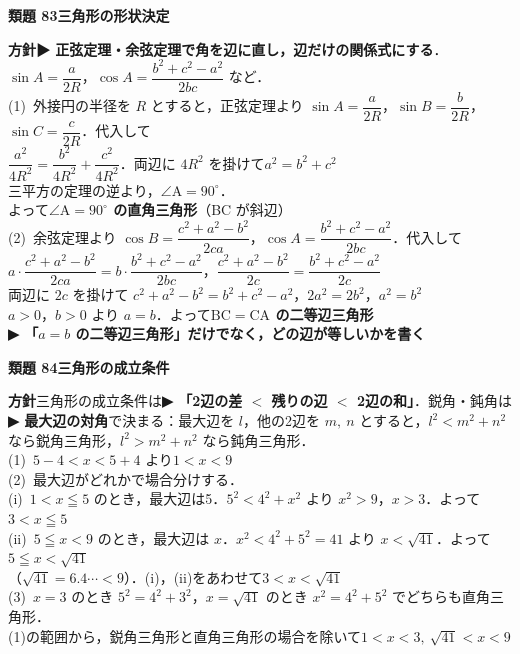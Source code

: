 \documentclass[a4paper,11pt]{ltjsarticle}
\newcommand{\ans}[2]{\Needspace{5\baselineskip}\vspace{6pt}%
  {\sffamily\bfseries 類題 #1\quad #2}\par}
\newcommand{\point}[1]{\textsf{\bfseries ▶ #1}}
\begin{document}
\ans{83}{三角形の形状決定}
\begin{kai}
\textbf{方針}\quad \point{正弦定理・余弦定理で角を辺に直し，辺だけの関係式にする}．$\sin A=\dfrac a{2R}$，$\cos A=\dfrac{b^2+c^2-a^2}{2bc}$ など．\\[2pt]
(1)\ 外接円の半径を $R$ とすると，正弦定理より $\sin A=\dfrac a{2R}$，$\sin B=\dfrac b{2R}$，$\sin C=\dfrac c{2R}$．代入して\\
\hspace*{1.5em}$\dfrac{a^2}{4R^2}=\dfrac{b^2}{4R^2}+\dfrac{c^2}{4R^2}$．両辺に $4R^2$ を掛けて\quad $a^2=b^2+c^2$\\
\hspace*{1.5em}三平方の定理の逆より，$\angle\mathrm A=90^\circ$．\\
\hspace*{1.5em}よって\quad \textbf{$\angle\mathrm A=90^\circ$ の直角三角形}（BC が斜辺）\\[2pt]
(2)\ 余弦定理より $\cos B=\dfrac{c^2+a^2-b^2}{2ca}$，$\cos A=\dfrac{b^2+c^2-a^2}{2bc}$．代入して\\
\hspace*{1.5em}$a\cdot\dfrac{c^2+a^2-b^2}{2ca}=b\cdot\dfrac{b^2+c^2-a^2}{2bc}$，\quad $\dfrac{c^2+a^2-b^2}{2c}=\dfrac{b^2+c^2-a^2}{2c}$\\[2pt]
\hspace*{1.5em}両辺に $2c$ を掛けて $c^2+a^2-b^2=b^2+c^2-a^2$，\quad $2a^2=2b^2$，\quad $a^2=b^2$\\
\hspace*{1.5em}$a>0$，$b>0$ より $a=b$．よって\quad \textbf{$\mathrm{BC}=\mathrm{CA}$ の二等辺三角形}\\
\hspace*{1.5em}\point{「$a=b$ の二等辺三角形」だけでなく，どの辺が等しいかを書く}
\end{kai}

\ans{84}{三角形の成立条件}
\begin{kai}
\textbf{方針}\quad 三角形の成立条件は\point{「2辺の差 $<$ 残りの辺 $<$ 2辺の和」}．鋭角・鈍角は\point{最大辺の対角}で決まる：最大辺を $l$，他の2辺を $m,\ n$ とすると，$l^2<m^2+n^2$ なら鋭角三角形，$l^2>m^2+n^2$ なら鈍角三角形．\\[2pt]
(1)\ $5-4<x<5+4$ より\quad $1<x<9$\\[2pt]
(2)\ 最大辺がどれかで場合分けする．\\
\hspace*{1.5em}(i)\ $1<x\leqq5$ のとき，最大辺は5．$5^2<4^2+x^2$ より $x^2>9$，$x>3$．よって $3<x\leqq5$\\
\hspace*{1.5em}(ii)\ $5\leqq x<9$ のとき，最大辺は $x$．$x^2<4^2+5^2=41$ より $x<\sqrt{41}$．よって $5\leqq x<\sqrt{41}$\\
\hspace*{1.5em}（$\sqrt{41}=6.4\cdots<9$）．(i)，(ii)をあわせて\quad $3<x<\sqrt{41}$\\[2pt]
(3)\ $x=3$ のとき $5^2=4^2+3^2$，$x=\sqrt{41}$ のとき $x^2=4^2+5^2$ でどちらも直角三角形．\\
\hspace*{1.5em}(1)の範囲から，鋭角三角形と直角三角形の場合を除いて\quad $1<x<3,\ \sqrt{41}<x<9$
\end{kai}
\end{document}
